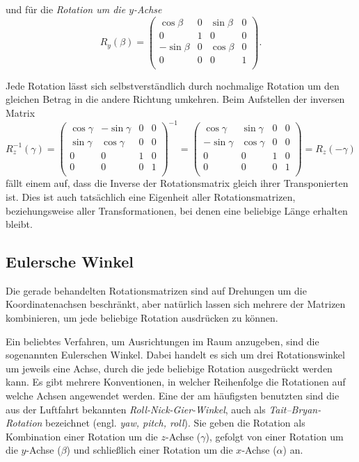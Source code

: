 und für die \emph{Rotation um die $y$-Achse}
\begin{equation}
 R_y{(\beta)}
 = 
 \begin{pmatrix}
  \cos \beta & 0 & \sin \beta & 0 \\
  0 & 1 & 0 & 0 \\
  -\sin \beta & 0 & \cos \beta & 0 \\
  0 & 0 & 0 & 1 \\
 \end{pmatrix}.
\end{equation}

Jede Rotation lässt sich selbstverständlich durch nochmalige Rotation um den gleichen Betrag in die andere Richtung umkehren. Beim Aufstellen der inversen Matrix
\begin{equation}
 R_z^{-1}{(\gamma)}
 = 
 \begin{pmatrix}
  \cos \gamma & -\sin \gamma & 0 & 0 \\
  \sin \gamma &  \cos \gamma & 0 & 0 \\
  0 & 0 & 1 & 0 \\
  0 & 0 & 0 & 1 \\
 \end{pmatrix}^{-1}
 = 
 \begin{pmatrix}
   \cos \gamma & \sin \gamma & 0 & 0 \\
  -\sin \gamma & \cos \gamma & 0 & 0 \\
  0 & 0 & 1 & 0 \\
  0 & 0 & 0 & 1 \\
 \end{pmatrix}
 = R_z{(-\gamma)}
\end{equation}
fällt einem auf, dass die Inverse der Rotationsmatrix gleich ihrer Transponierten ist. Dies ist auch tatsächlich eine Eigenheit aller Rotationsmatrizen, beziehungsweise aller Transformationen, bei denen eine beliebige Länge erhalten bleibt.

\subsection{Eulersche Winkel}
Die gerade behandelten Rotationsmatrizen sind auf Drehungen um die Koordinatenachsen beschränkt, aber natürlich lassen sich mehrere der Matrizen kombinieren, um jede beliebige Rotation ausdrücken zu können.

Ein beliebtes Verfahren, um Ausrichtungen im Raum anzugeben, sind die sogenannten Eulerschen Winkel. Dabei handelt es sich um drei Rotationswinkel um jeweils eine Achse, durch die jede beliebige Rotation ausgedrückt werden kann. Es gibt mehrere Konventionen, in welcher Reihenfolge die Rotationen auf welche Achsen angewendet werden. Eine der am häufigsten benutzten sind die aus der Luftfahrt bekannten \emph{Roll-Nick-Gier-Winkel}, auch als \emph{Tait–Bryan-Rotation} bezeichnet (engl. \emph{yaw, pitch, roll}). Sie geben die Rotation als Kombination einer Rotation um die $z$-Achse ($\gamma$), gefolgt von einer Rotation um die $y$-Achse ($\beta$) und schließlich einer Rotation um die $x$-Achse ($\alpha$) an.

